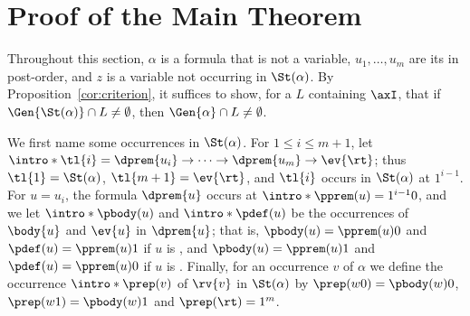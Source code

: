 \section{Proof of the Main Theorem}\label{sec:proof}

Throughout this section, $\alpha$ is a formula that is not a variable,
$u_1,\dots,u_m$ are its  in post-order, and $z$
is a variable not occurring in $\St(\alpha)$. By
Proposition~\ref{cor:criterion}, it suffices to show, for a 
$L$ containing $\axI$, that if $\Gen{\St(\alpha)}\cap L\neq\emptyset$, then
$\Gen{\alpha}\cap L\neq\emptyset$.

\AP We first name some occurrences in $\St(\alpha)$. For $1\le i\le m+1$,
let $\intro*\tl{i}=\dprem{u_i}\to\dots\to\dprem{u_m}\to\ev{\rt}$; thus
$\tl{1}=\St(\alpha)$, $\tl{m+1}=\ev{\rt}$, and $\tl{i}$ occurs in
$\St(\alpha)$ at $1^{i-1}$. For $u=u_i$, the formula $\dprem{u}$ occurs at
$\intro*\pprem(u)=1^{i-1}0$, and we let $\intro*\pbody(u)$ and
$\intro*\pdef(u)$ be the occurrences of $\body{u}$ and $\ev{u}$ in
$\dprem{u}$; that is, $\pbody(u)=\pprem(u)0$ and $\pdef(u)=\pprem(u)1$ if
$u$ is , and $\pbody(u)=\pprem(u)1$ and $\pdef(u)=\pprem(u)0$
if $u$ is . Finally, for an occurrence $v$ of $\alpha$ we
define the occurrence $\intro*\prep(v)$ of $\rv{v}$ in $\St(\alpha)$ by
$\prep(w0)=\pbody(w)0$, $\prep(w1)=\pbody(w)1$ and $\prep(\rt)=1^m$.


